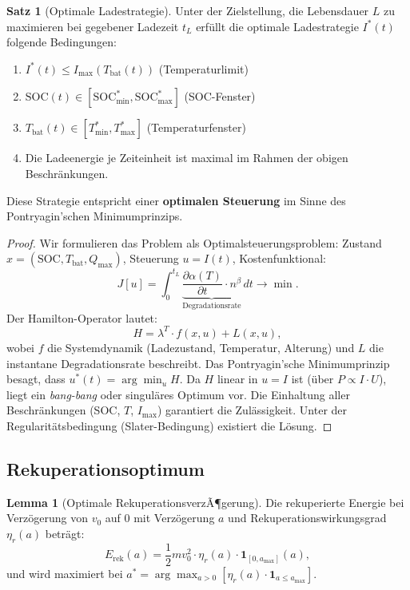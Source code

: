 ﻿\documentclass[a4paper,12pt]{article}
\theoremstyle{definition}
\newtheorem{satz}{Satz}
\newtheorem{lemma}{Lemma}
\begin{document}
\begin{satz}[Optimale Ladestrategie]
\label{satz:laden}
  Unter der Zielstellung, die Lebensdauer $L$ zu maximieren bei gegebener
  Ladezeit $t_L$ erf\"ullt die optimale Ladestrategie $I^*(t)$ folgende
  Bedingungen:
  \begin{enumerate}
    \item $I^*(t) \leq I_{\max}(T_{\mathrm{bat}}(t))$ (Temperaturlimit)
    \item $\mathrm{SOC}(t) \in [\mathrm{SOC}_{\min}^*, \mathrm{SOC}_{\max}^*]$ (SOC-Fenster)
    \item $T_{\mathrm{bat}}(t) \in [T_{\min}^*, T_{\max}^*]$ (Temperaturfenster)
    \item Die Ladeenergie je Zeiteinheit ist maximal im Rahmen der obigen Beschr\"ankungen.
  \end{enumerate}
  Diese Strategie entspricht einer \textbf{optimalen Steuerung} im Sinne des
  Pontryagin'schen Minimumprinzips.
\end{satz}

\begin{proof}
  Wir formulieren das Problem als Optimalsteuerungsproblem:
  Zustand $x = (\mathrm{SOC}, T_{\mathrm{bat}}, Q_{\max})$,
  Steuerung $u = I(t)$, Kostenfunktional:
  \[
    J[u] = \int_0^{t_L} \underbrace{\frac{\partial \alpha(T)}{\partial t} \cdot n^{\beta}}_{\text{Degradationsrate}} \, dt
    \to \min.
  \]
  Der Hamilton-Operator lautet:
  \[
    H = \lambda^T \cdot f(x, u) + L(x, u),
  \]
  wobei $f$ die Systemdynamik (Ladezustand, Temperatur, Alterung) und $L$ die
  instantane Degradationsrate beschreibt.
  Das Pontryagin'sche Minimumprinzip besagt, dass $u^*(t) = \arg\min_u H$.
  Da $H$ linear in $u = I$ ist (\"uber $P \propto I \cdot U$), liegt ein
  \emph{bang-bang} oder singul\"ares Optimum vor. Die Einhaltung aller
  Beschr\"ankungen (SOC, $T$, $I_{\max}$) garantiert die Zul\"assigkeit.
  Unter der Regularit\"atsbedingung (Slater-Bedingung) existiert die L\"osung.
\end{proof}

\subsection{Rekuperationsoptimum}

\begin{lemma}[Optimale RekuperationsverzÃ¶gerung]
\label{lem:rekup}
  Die rekuperierte Energie bei Verz\"ogerung von $v_0$ auf $0$ mit
  Verz\"ogerung $a$ und Rekuperationswirkungsgrad $\eta_r(a)$ betr\"agt:
  \[
    E_{\mathrm{rek}}(a) = \frac{1}{2} m v_0^2 \cdot \eta_r(a)
      \cdot \mathbf{1}_{[0, a_{\max}]}(a),
  \]
  und wird maximiert bei $a^* = \arg\max_{a > 0} [\eta_r(a) \cdot \mathbf{1}_{a \leq a_{\max}}]$.
\end{lemma}
\end{document}
